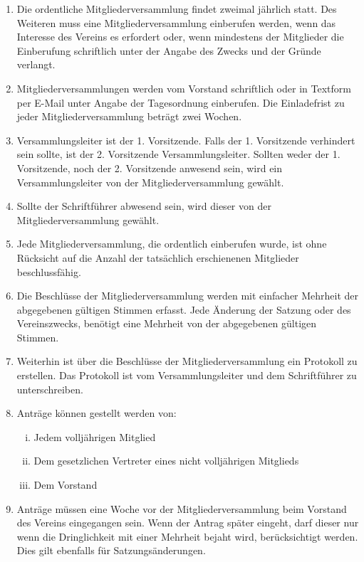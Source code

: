 \documentclass[a4paper,11pt]{article}
\begin{document}
\begin{enumerate}[§ 1.]
\begin{enumerate}[1.]
\item Die ordentliche Mitgliederversammlung findet zweimal jährlich statt. Des Weiteren muss eine Mitgliederversammlung einberufen werden, wenn das Interesse des Vereins es erfordert oder, wenn mindestens  der Mitglieder die Einberufung schriftlich unter der Angabe des Zwecks und der Gründe verlangt.
\item Mitgliederversammlungen werden vom Vorstand schriftlich oder in Textform per E-Mail unter Angabe der Tagesordnung einberufen. Die Einladefrist zu jeder Mitgliederversammlung beträgt zwei Wochen.
\item Versammlungsleiter ist der 1. Vorsitzende. Falls der 1. Vorsitzende verhindert sein sollte, ist der 2. Vorsitzende Versammlungsleiter. Sollten weder der 1. Vorsitzende, noch der 2. Vorsitzende anwesend sein, wird ein Versammlungsleiter von der Mitgliederversammlung gewählt.
\item Sollte der Schriftführer abwesend sein, wird dieser von der Mitgliederversammlung gewählt.
\item Jede Mitgliederversammlung, die ordentlich einberufen wurde, ist ohne Rücksicht auf die
Anzahl der tatsächlich erschienenen Mitglieder beschlussfähig.
\item Die Beschlüsse der Mitgliederversammlung werden mit einfacher Mehrheit der abgegebenen
gültigen Stimmen erfasst. Jede Änderung der Satzung oder des Vereinszwecks, benötigt eine
Mehrheit von  der abgegebenen gültigen Stimmen.
\item Weiterhin ist über die Beschlüsse der Mitgliederversammlung ein Protokoll zu erstellen. Das
Protokoll ist vom Versammlungsleiter und dem Schriftführer zu unterschreiben.
\item Anträge können gestellt werden von:
\begin{enumerate}[i)]
\item Jedem volljährigen Mitglied
\item Dem gesetzlichen Vertreter eines nicht volljährigen Mitglieds
\item Dem Vorstand
\end{enumerate}
\item Anträge müssen eine Woche vor der Mitgliederversammlung beim Vorstand des Vereins eingegangen sein. Wenn der Antrag später eingeht, darf dieser nur wenn die Dringlichkeit mit einer  Mehrheit bejaht wird, berücksichtigt werden. Dies gilt ebenfalls für Satzungsänderungen.
\end{enumerate}


\end{enumerate}
\end{document}
